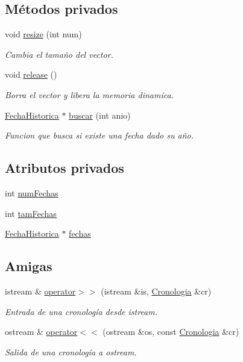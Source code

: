 \subsection*{Métodos privados}
\begin{DoxyCompactItemize}
\item 
void \hyperlink{classCronologia_ae10371de1410f2431021cea67a006c8d}{resize} (int num)
\begin{DoxyCompactList}\small\item\em Cambia el tamaño del vector. \end{DoxyCompactList}\item 
void \hyperlink{classCronologia_a7e1e47606ad4c408238173a95f05a7e6}{release} ()
\begin{DoxyCompactList}\small\item\em Borra el vector y libera la memoria dinamica. \end{DoxyCompactList}\item 
\hyperlink{classFechaHistorica}{Fecha\+Historica} $\ast$ \hyperlink{classCronologia_abd78c892efd74f3e1138a418772bc21c}{buscar} (int anio)
\begin{DoxyCompactList}\small\item\em Funcion que busca si existe una fecha dado su año. \end{DoxyCompactList}\end{DoxyCompactItemize}
\subsection*{Atributos privados}
\begin{DoxyCompactItemize}
\item 
int \hyperlink{classCronologia_a26810731cb188a3a026586a248225496}{num\+Fechas}
\item 
int \hyperlink{classCronologia_a35e0a337270fea5091c74544b43b3898}{tam\+Fechas}
\item 
\hyperlink{classFechaHistorica}{Fecha\+Historica} $\ast$ \hyperlink{classCronologia_a07e368866bedb6287af5787923ec31c7}{fechas}
\end{DoxyCompactItemize}
\subsection*{Amigas}
\begin{DoxyCompactItemize}
\item 
istream \& \hyperlink{classCronologia_a3436f2476c2b5845bc88dfbe6d81b8cd}{operator$>$$>$} (istream \&is, \hyperlink{classCronologia}{Cronologia} \&cr)
\begin{DoxyCompactList}\small\item\em Entrada de una cronología desde istream. \end{DoxyCompactList}\item 
ostream \& \hyperlink{classCronologia_ae4e05c9547fb694b0413f46f8d5542a9}{operator$<$$<$} (ostream \&os, const \hyperlink{classCronologia}{Cronologia} \&cr)
\begin{DoxyCompactList}\small\item\em Salida de una cronología a ostream. \end{DoxyCompactList}\end{DoxyCompactItemize}


